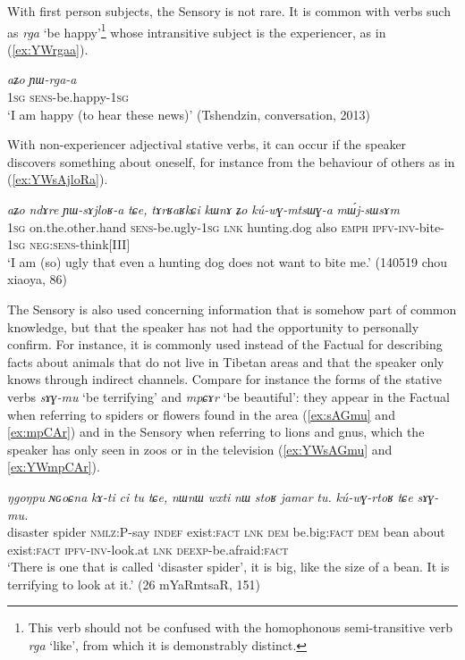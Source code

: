 \documentclass[oldfontcommands,oneside,a4paper,11pt]{article}
\newcommand{\ipa}[1]{{\phon\textit{#1}}} %
\newcommand{\refb}[1]{(\ref{#1})}
\newcommand{\factual}[1]{\textsc{:fact}}
\begin{document}
With first person subjects, the Sensory is not rare. It is common with verbs such as \ipa{rga} `be happy'\footnote{This verb should not be confused with the homophonous semi-transitive verb \ipa{rga} `like', from which it is demonstrably distinct.} whose intransitive subject is the experiencer, as in \refb{ex:YWrgaa}.

\begin{exe}
\ex \label{ex:YWrgaa}
\gll 
 \ipa{aʑo} \ipa{ɲɯ-rga-a} \\
 \textsc{1sg} \textsc{sens}-be.happy-\textsc{1sg} \\
\glt `I am happy (to hear these news)' (Tshendzin, conversation, 2013)
\end{exe}

With non-experiencer adjectival stative verbs, it can occur if the speaker discovers something about oneself, for instance from the behaviour of others as in \refb{ex:YWsAjloRa}.

\begin{exe}
\ex \label{ex:YWsAjloRa}
\gll 
\ipa{aʑo} 	\ipa{ndɤre} 	\ipa{ɲɯ-sɤjloʁ-a} 	\ipa{tɕe,} \ipa{tɤrʁaʁkɕi} 	\ipa{kɯnɤ} 	\ipa{ʑo} 	\ipa{kú-wɣ-mtsɯɣ-a} 	\ipa{mɯ́j-sɯsɤm} \\
\textsc{1sg} on.the.other.hand \textsc{sens}-be.ugly-\textsc{1sg} \textsc{lnk} hunting.dog also \textsc{emph} \textsc{ipfv-inv}-bite-\textsc{1sg} \textsc{neg:sens}-think[III] \\
\glt `I am (so) ugly that even a hunting dog does not want to bite me.'  (140519 chou xiaoya, 86)
\end{exe}

The Sensory is also used concerning information that is somehow part of common knowledge, but that the speaker has not had the opportunity to personally confirm. For instance, it is commonly used instead of the Factual for describing facts about animals that do not live in Tibetan areas and that the speaker only knows through indirect channels. Compare for instance the forms of the stative verbs \ipa{sɤɣ-mu} `be terrifying' and \ipa{mpɕɤr} `be beautiful': they appear in the Factual when referring to  spiders or flowers found in the area (\ref{ex:sAGmu} and \ref{ex:mpCAr}) and in the Sensory when referring to lions and gnus, which the speaker has only seen in zoos or in the television  (\ref{ex:YWsAGmu} and \ref{ex:YWmpCAr}).
 
 \begin{exe}
\ex \label{ex:sAGmu}
\gll 
\ipa{ŋgoŋpu}  	\ipa{ɴɢoɕna}  	\ipa{kɤ-ti}  	\ipa{ci}  	\ipa{tu}  	\ipa{tɕe,}  	\ipa{nɯnɯ}  	\ipa{wxti}  	\ipa{nɯ}  	\ipa{stoʁ}  	\ipa{jamar}  	\ipa{tu.}  	\ipa{kú-wɣ-rtoʁ}  	\ipa{tɕe}  	\ipa{sɤɣ-mu.}  \\
disaster spider \textsc{nmlz}:P-say \textsc{indef} exist\factual{} \textsc{lnk} \textsc{dem} be.big\factual{}  \textsc{dem} bean about exist\factual{} \textsc{ipfv-inv}-look.at \textsc{lnk} \textsc{deexp}-be.afraid\factual{}  \\
\glt `There is one that is  called `disaster spider', it is big, like the size of a bean. It is terrifying to look at it.' (26 mYaRmtsaR, 151)
\end{exe}
\end{document}
